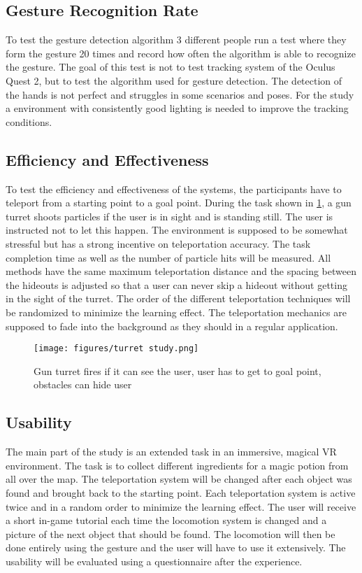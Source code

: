\subsection{Gesture Recognition Rate}
To test the gesture detection algorithm 3 different people run a test where they form the gesture 20 times and record how often the algorithm is able to recognize the gesture.
The goal of this test is not to test tracking system of the Oculus Quest 2, but to test the algorithm used for gesture detection. The detection of the hands is not perfect and struggles in some scenarios and poses. For the study a environment with consistently good lighting is needed to improve the tracking conditions. 


\subsection{Efficiency and Effectiveness}
To test the efficiency and effectiveness of the systems, the participants have to teleport from a starting point to a goal point. During the task shown in \ref{fig:turret}, a gun turret shoots particles if the user is in sight and is standing still. The user is instructed not to let this happen. The environment is supposed to be somewhat stressful but has a strong incentive on teleportation accuracy. The task completion time as well as the number of particle hits will be measured. All methods have the same maximum teleportation distance and the spacing between the hideouts is adjusted so that a user can never skip a hideout without getting in the sight of the turret. The order of the different teleportation techniques will be randomized to minimize the learning effect. The teleportation mechanics are supposed to fade into the background as they should in a regular application. 

\begin{figure}[hbt!]
    \centering
    \texttt{[image: figures/turret study.png]}
    \caption{Gun turret fires if it can see the user, user has to get to goal point, obstacles can hide user}
    \label{fig:turret}
\end{figure}


\subsection{Usability}
The main part of the study is an extended task in an immersive, magical VR environment.
The task is to collect different ingredients for a magic potion from all over the map. The teleportation system will be changed after each object was found and brought back to the starting point. Each teleportation system is active twice and in a random order to minimize the learning effect. The user will receive a short in-game tutorial each time the locomotion system is changed and a picture of the next object that should be found. The locomotion will then be done entirely using the gesture and the user will have to use it extensively. The usability will be evaluated using a questionnaire after the experience. 


